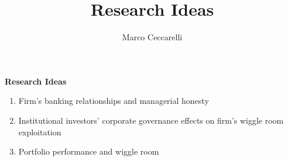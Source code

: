 \documentclass[11pt,a4paper,paranthesis]{article}
\author{Marco Ceccarelli}
\title{ \large Research Ideas}
\begin{document}
\begin{center}
	{\large \textbf{Research Ideas}}
\end{center}


\begin{enumerate}
	\item Firm's banking relationships and managerial honesty \label{idea:bank}
	
	\item Institutional investors' corporate governance effects on firm's wiggle room exploitation \label{idea:CorpGov}
	
	\item Portfolio performance and wiggle room \label{idea:SyntheticPortf}
\end{enumerate}


\end{document}
